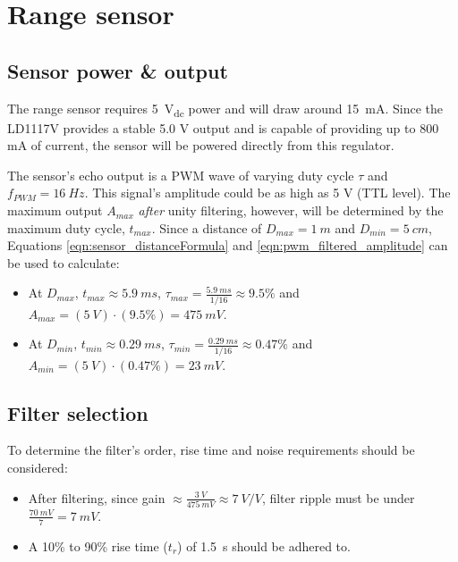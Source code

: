 \graphicspath{{content/2_design/figures/}}
\section{Range sensor}
\subsection{Sensor power \& output}{\label{rangeSensor_powerOutput}}
The range sensor requires \SI{5}{V_{dc}} power and will draw around \SI{15}{mA}. Since the LD1117V provides a stable 5.0 V output and is capable
of providing up to 800 mA of current, the sensor will be powered directly from this regulator.

The sensor's echo output is a PWM wave of varying duty cycle $\tau$ and $f_{PWM} = \SI{16}{Hz}$.
This signal's amplitude could be as high as 5 V (TTL level). The maximum output $A_{max}$ \textit{after} unity filtering,
however, will be determined by the maximum duty cycle, $t_{max}$. Since a distance of $D_{max} = \SI{1}{m}$ and $D_{min} = \SI{5}{cm}$,
Equations \ref{eqn:sensor_distanceFormula} and \ref{eqn:pwm_filtered_amplitude} can be used to calculate:
\begin{itemize}
  \item At $D_{max}$, $t_{max} \approx \SI{5.9}{ms}$, $\tau_{max} = \frac{\SI{5.9}{ms}}{1/16} \approx 9.5 \%$ and $A_{max} = (\SI{5}{V}) \cdot (9.5 \%) = \SI{475}{mV} $.
  \item At $D_{min}$, $t_{min} \approx \SI{0.29}{ms}$, $\tau_{min} = \frac{\SI{0.29}{ms}}{1/16} \approx 0.47 \%$ and $A_{min} = (\SI{5}{V}) \cdot (0.47 \%) = \SI{23}{mV} $.
\end{itemize}

\subsection{Filter selection}{\label{rangeSensor_filterSelection}}

To determine the filter's order, rise time and noise requirements should be considered:
\begin{itemize}
  \item After filtering, since gain $\approx \frac{\SI{3}{V}}{\SI{475}{mV}} \approx \SI{7}{V/V}$, filter ripple must be under $ \frac{\SI{70}{mV}}{7} = \SI{7}{mV}$.
  \item A 10\% to 90\% rise time ($t_r$) of \SI{1.5}{s} should be adhered to.
\end{itemize}

